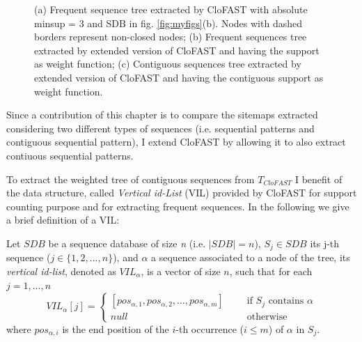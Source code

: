\begin{figure}
\caption{(a) Frequent sequence tree extracted by CloFAST with absolute minsup = 3 and SDB in fig. \ref{fig:myfigs}(b). Nodes with
dashed borders represent non-closed nodes; (b) Frequent sequences tree extracted by extended version of CloFAST and having the support as weight function; (c) Contiguous sequences tree extracted by extended version of CloFAST and having the contiguous support as weight function.}
\label{3fig:clofast}
\end{figure}

Since a contribution of this chapter is to compare the sitemaps extracted considering two different types of sequences (i.e. sequential patterns and contiguous sequential pattern), I extend CloFAST by allowing it to also extract contiuous sequential patterns. 

To extract the weighted tree of contiguous sequences from $T_{CloFAST}$ I benefit of the data structure, called \textit{Vertical id-List} (VIL) provided by CloFAST for support counting purpose and for extracting frequent sequences. In the following we give a brief definition of a VIL:
\begin{definition}
Let $SDB$ be a sequence database of size \emph{n} (i.e. $|SDB| = n$), $S_j \in SDB$ its j-th sequence ($j \in \{1,2,\ldots,n\}$), and $\alpha$ a sequence associated to a node of the tree, its \emph{vertical id-list}, denoted as $VIL_{\alpha}$, is a vector of size $n$, such that for each $j=1,\ldots,n$
\begin{displaymath}
VIL_\alpha[j] = \left\{ \begin{array}{ll}
\textrm{$[pos_{\alpha,1}, pos_{\alpha,2}, \ldots, pos_{\alpha,m}]$ }\ \ \ \ & \textrm{if $S_j$ contains $\alpha$}\\
null & \textrm{otherwise}
\end{array} \right.
\end{displaymath}
where \emph{$pos_{\alpha,i}$} is the end position of the $i$-th occurrence ($i\leq m$) of $\alpha$ in $S_j$. 
\end{definition}


